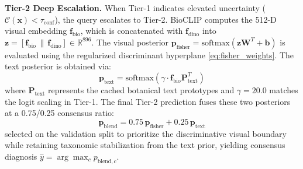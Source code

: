 \documentclass[conference]{IEEEtran}
\begin{document}
\textbf{Tier-2 Deep Escalation.} When Tier-1 indicates elevated uncertainty ($\mathcal{C}(\mathbf{x}) < \tau_{\text{conf}}$), the query escalates to Tier-2. BioCLIP computes the 512-D visual embedding $\mathbf{f}_{\text{bio}}$, which is concatenated with $\mathbf{f}_{\text{dino}}$ into $\mathbf{z} = [\mathbf{f}_{\text{bio}} \,\|\, \mathbf{f}_{\text{dino}}] \in \mathbb{R}^{896}$. The visual posterior $\mathbf{p}_{\text{fisher}} = \text{softmax}\left(\mathbf{z} \mathbf{W}^T + \mathbf{b}\right)$ is evaluated using the regularized discriminant hyperplane \eqref{eq:fisher_weights}. The text posterior is obtained via:
\begin{equation}
    \mathbf{p}_{\text{text}} = \text{softmax}\left(\gamma \cdot \mathbf{f}_{\text{bio}} \mathbf{P}_{\text{text}}^T\right)
\end{equation}
where $\mathbf{P}_{\text{text}}$ represents the cached botanical text prototypes and $\gamma = 20.0$ matches the logit scaling in Tier-1. The final Tier-2 prediction fuses these two posteriors at a 0.75/0.25 consensus ratio:
\begin{equation}
    \label{eq:multimodal_blend}
    \mathbf{p}_{\text{blend}} = 0.75 \, \mathbf{p}_{\text{fisher}} + 0.25 \, \mathbf{p}_{\text{text}}
\end{equation}
selected on the validation split to prioritize the discriminative visual boundary while retaining taxonomic stabilization from the text prior, yielding consensus diagnosis $\hat{y} = \arg\max_c p_{\text{blend}, c}$.
\end{document}
